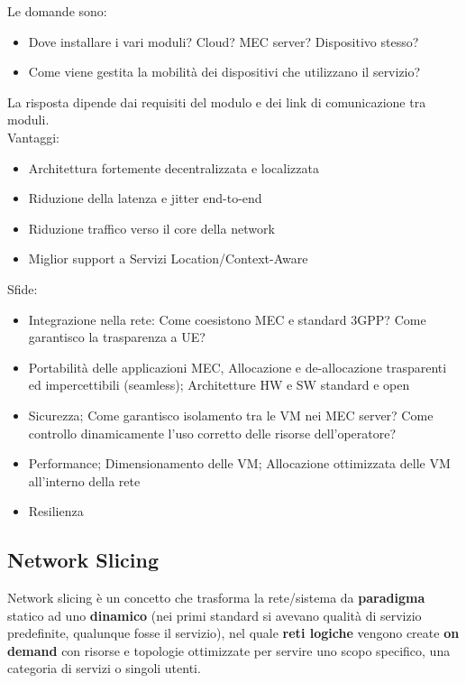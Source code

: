 Le domande sono: 
\begin{itemize}
	\item Dove installare i vari moduli? Cloud? MEC server? Dispositivo stesso? 
	\item Come viene gestita la mobilità dei dispositivi che utilizzano il servizio?
\end{itemize}
La risposta dipende dai requisiti del modulo e dei link di comunicazione tra moduli.\\

Vantaggi: 
\begin{itemize}
	\item Architettura fortemente decentralizzata e localizzata
	\item Riduzione della latenza e jitter end-to-end
	\item Riduzione traffico verso il core della network
	\item Miglior support a Servizi Location/Context-Aware
\end{itemize}

\newpage

Sfide: 
\begin{itemize}
	\item Integrazione nella rete: Come coesistono MEC e standard 3GPP? Come garantisco la trasparenza a UE?
	\item Portabilità delle applicazioni MEC, Allocazione e de-allocazione trasparenti ed impercettibili (seamless); Architetture HW e SW standard e open
	\item Sicurezza; Come garantisco isolamento tra le VM nei MEC server? Come controllo dinamicamente l'uso corretto delle risorse
	dell'operatore?
	\item Performance; Dimensionamento delle VM; Allocazione ottimizzata delle VM all'interno della rete
	\item Resilienza
\end{itemize}

\subsection{Network Slicing}

Network slicing è un concetto che trasforma la rete/sistema  da \textbf{paradigma} statico ad uno \textbf{dinamico} (nei primi standard si avevano qualità di servizio predefinite, qualunque fosse il servizio), nel quale \textbf{reti logiche} vengono create \textbf{on demand} con risorse e topologie ottimizzate per servire uno scopo specifico, una categoria di servizi o singoli utenti.\\

